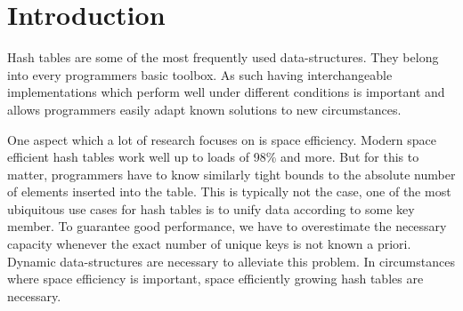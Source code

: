 \documentclass[a4paper,UKenglish]{lipics-v2016}
\begin{document}

\section{Introduction}
Hash tables are some of the most frequently used data-structures. They
belong into every programmers basic toolbox.  As such having
interchangeable implementations which perform well under different
conditions is important and allows programmers
easily adapt known solutions to new circumstances.

One aspect which a lot of research focuses on is space efficiency.
Modern space efficient hash tables work well up to loads of 98\% and
more. But for this to matter, programmers have to know similarly tight
bounds to the absolute number of elements inserted into the table.
This is typically not the case, one of the most ubiquitous use cases
for hash tables is to unify data according to some key member.  To
guarantee good performance, we have to overestimate the necessary
capacity whenever the exact number of unique keys is not known a
priori.  Dynamic data-structures are necessary to alleviate this
problem.  In circumstances where space efficiency is important, space
efficiently growing hash tables are necessary.
\end{document}
